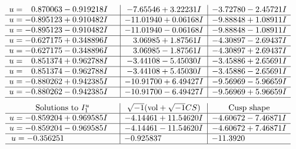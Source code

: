 \documentclass[1p]{elsarticle_modified}
\theoremstyle{definition}
\newcommand{\I}{\sqrt{-1}}
\begin{document}
$$\begin{array}{c|c|c}
\begin{aligned}
u &= \phantom{-}0.870063 - 0.919218 I\end{aligned}
 & -7.65546 + 3.22231 I & -3.72780 - 2.45721 I \\ \hline\begin{aligned}
u &= -0.895123 + 0.910482 I\end{aligned}
 & -11.01940 + 0.06168 I & -9.88848 + 1.08911 I \\ \hline\begin{aligned}
u &= -0.895123 - 0.910482 I\end{aligned}
 & -11.01940 - 0.06168 I & -9.88848 - 1.08911 I \\ \hline\begin{aligned}
u &= -0.627175 + 0.348896 I\end{aligned}
 & \phantom{-}3.06985 + 1.87561 I & -4.30897 - 2.69437 I \\ \hline\begin{aligned}
u &= -0.627175 - 0.348896 I\end{aligned}
 & \phantom{-}3.06985 - 1.87561 I & -4.30897 + 2.69437 I \\ \hline\begin{aligned}
u &= \phantom{-}0.851374 + 0.962788 I\end{aligned}
 & -3.44108 - 5.45030 I & -3.45886 + 2.65691 I \\ \hline\begin{aligned}
u &= \phantom{-}0.851374 - 0.962788 I\end{aligned}
 & -3.44108 + 5.45030 I & -3.45886 - 2.65691 I \\ \hline\begin{aligned}
u &= -0.880262 + 0.942385 I\end{aligned}
 & -10.91700 + 6.49427 I & -9.56969 - 5.96659 I \\ \hline\begin{aligned}
u &= -0.880262 - 0.942385 I\end{aligned}
 & -10.91700 - 6.49427 I & -9.56969 + 5.96659 I\\
 \hline 
 \end{array}$$\newpage$$\begin{array}{c|c|c}  
\text{Solutions to }I^u_{1}& \I (\text{vol} + \sqrt{-1}CS) & \text{Cusp shape}\\
 \hline 
\begin{aligned}
u &= -0.859204 + 0.969585 I\end{aligned}
 & -4.14461 + 11.54620 I & -4.60672 - 7.46871 I \\ \hline\begin{aligned}
u &= -0.859204 - 0.969585 I\end{aligned}
 & -4.14461 - 11.54620 I & -4.60672 + 7.46871 I \\ \hline\begin{aligned}
u &= -0.356251\phantom{ +0.000000I}\end{aligned}
 & -0.925837\phantom{ +0.000000I} & -11.3920\phantom{ +0.000000I}\\
 \hline 
 \end{array}$$\newpage
\end{document}
